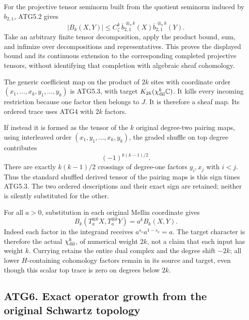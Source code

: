 For the projective tensor seminorm built from the quotient seminorm
induced by \(b_{2,1}\), ATG5.2 gives \[
\boxed{|B_k(X,Y)|\le C_\zeta^k\,
 \overline b_{2,1}^{\,\otimes_\pi k}(X)
 \overline b_{2,1}^{\,\otimes_\pi k}(Y).}
\tag{ATG5.5}
\] Take an arbitrary finite tensor decomposition, apply the product
bound, sum, and infimize over decompositions and representatives. This
proves the displayed bound and its continuous extension to the
corresponding completed projective tensors, without identifying that
completion with algebraic sheaf cohomology.

The generic coefficient map on the product of \(2k\) sites with
coordinate order \((x_1,\ldots,x_k,y_1,\ldots,y_k)\) is ATG5.3, with
target \(K_{2k}(\chi_{\rm dil}^k\mathbb C)\). It kills every incoming
restriction because one factor then belongs to \(J\). It is therefore a
sheaf map. Its ordered trace uses ATG4 with \(2k\) factors.

If instead it is formed as the tensor of the \(k\) original degree-two
pairing maps, using interleaved order \((x_1,y_1,\ldots,x_k,y_k)\), the
graded shuffle on top degree contributes \[
(-1)^{k(k-1)/2}.
\tag{ATG5.6}
\] There are exactly \(k(k-1)/2\) crossings of degree-one factors
\(y_i,x_j\) with \(i<j\). Thus the standard shuffled derived tensor of
the pairing maps is this sign times ATG5.3. The two ordered descriptions
and their exact sign are retained; neither is silently substituted for
the other.

For all \(a>0\), substitution in each original Mellin coordinate gives
\[
\boxed{B_k(T_a^{\otimes k}X,T_a^{\otimes k}Y)=a^k B_k(X,Y).}
\tag{ATG5.7}
\] Indeed each factor in the integrand receives
\(a^{s_\nu}a^{1-s_\nu}=a\). The target character is therefore the actual
\(\chi_{\rm dil}^k\), of numerical weight \(2k\), not a claim that each
input has weight \(k\). Currying retains the entire dual complex and the
degree shift \(-2k\); all lower \(H\)-containing cohomology factors
remain in its source and target, even though this scalar top trace is
zero on degrees below \(2k\).

\subsection{ATG6. Exact operator growth from the original Schwartz
topology}\label{atg6.-exact-operator-growth-from-the-original-schwartz-topology}


